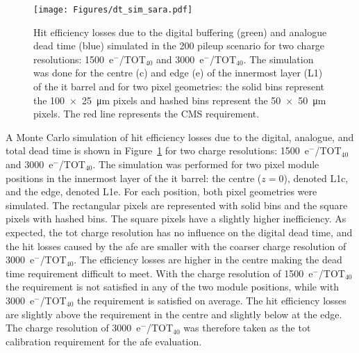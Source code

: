 \begin{figure}[!b]
    \centering
    \texttt{[image: Figures/dt\_sim\_sara.pdf]}
    \caption{Hit efficiency losses due to the digital buffering (green) and analogue dead time (blue) simulated in the 200 pileup scenario for two charge resolutions: \num{1500}~e${^{-}}$/TOT$_{40}$ and \num{3000}~e${^{-}}$/TOT$_{40}$. The simulation was done for the centre (c) and edge (e) of the innermost layer (L1) of the \gls{it} barrel and for two pixel geometries: the solid bins represent the \SI[product-units = power]{100x25}{\micro\meter} pixels and hashed bins represent the \SI[product-units = power]{50x50}{\micro\meter} pixels. The red line represents the CMS requirement.}
    \label{fig:dt-simulation}
\end{figure}

A Monte Carlo simulation of hit efficiency losses due to the digital, analogue, and total dead time is shown in Figure~\ref{fig:dt-simulation} for two charge resolutions: \num{1500}~e${^{-}}$/TOT$_{40}$ and \num{3000}~e${^{-}}$/TOT$_{40}$. The simulation was performed for two pixel module positions in the innermost layer of the \gls{it} barrel: the centre ($z=0$), denoted L1c, and the edge, denoted L1e.
For each position, both pixel geometries were simulated. The rectangular pixels are represented with solid bins and the square pixels with hashed bins. The square pixels have a slightly higher inefficiency. 
As expected, the \gls{tot} charge resolution has no influence on the digital dead time, and the hit losses caused by the \gls{afe} are smaller with the coarser charge resolution of \num{3000}~e${^{-}}$/TOT$_{40}$. 
The efficiency losses are higher in the centre making the dead time requirement difficult to meet. With the charge resolution of \num{1500}~e${^{-}}$/TOT$_{40}$ the requirement is not satisfied in any of the two module positions, while with \num{3000}~e${^{-}}$/TOT$_{40}$ the requirement is satisfied on average. The hit efficiency losses are slightly above the requirement in the centre and slightly below at the edge. The charge resolution of \num{3000}~e${^{-}}$/TOT$_{40}$ was therefore taken as the \gls{tot} calibration requirement for the \gls{afe} evaluation.

